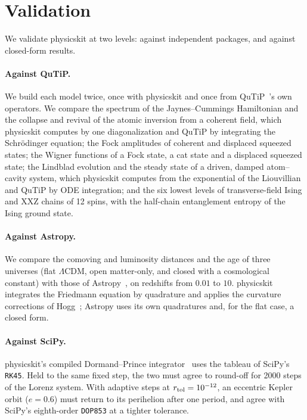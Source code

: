 \documentclass[11pt,a4paper]{article}
\newcommand{\code}[1]{\texttt{#1}}
\begin{document}
\section{Validation}
\label{sec:validation}

We validate physicskit at two levels: against independent packages, and
against closed-form results.

\paragraph{Against QuTiP.} We build each model twice, once with physicskit
and once from QuTiP~\qutipversion's own operators. We compare the
spectrum of the Jaynes--Cummings Hamiltonian and the collapse and revival
of the atomic inversion from a coherent field, which physicskit computes by
one diagonalization and QuTiP by integrating the Schr\"odinger equation;
the Fock amplitudes of coherent and displaced squeezed states; the Wigner
functions of a Fock state, a cat state and a displaced squeezed state; the
Lindblad evolution and the steady state of a driven, damped atom--cavity
system, which physicskit computes from the exponential of the Liouvillian
and QuTiP by ODE integration; and the six lowest levels of transverse-field
Ising and XXZ chains of 12 spins, with the half-chain entanglement entropy
of the Ising ground state.

\paragraph{Against Astropy.} We compare the comoving and luminosity
distances and the age of three universes (flat $\Lambda$CDM, open
matter-only, and closed with a cosmological constant) with those of
Astropy~\astropyversion, on redshifts from $0.01$ to $10$. physicskit
integrates the Friedmann equation by quadrature and applies the curvature
corrections of Hogg~\cite{hogg1999}; Astropy uses its own quadratures and,
for the flat case, a closed form.

\paragraph{Against SciPy.} physicskit's compiled Dormand--Prince
integrator~\cite{dormand1980} uses the tableau of SciPy's \code{RK45}. Held
to the same fixed step, the two must agree to round-off for 2000 steps of
the Lorenz system. With adaptive steps at $r_{\rm tol}=10^{-12}$, an
eccentric Kepler orbit ($e=0.6$) must return to its perihelion after one
period, and agree with SciPy's eighth-order \code{DOP853} at a tighter
tolerance.
\end{document}
